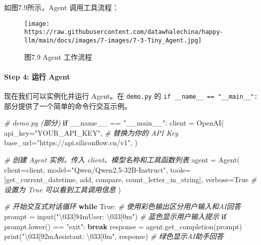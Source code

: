 \documentclass[
]{article}
\newenvironment{Shaded}{}{}
\newcommand{\BuiltInTok}[1]{\textcolor[rgb]{0.00,0.50,0.00}{#1}}
\newcommand{\CharTok}[1]{\textcolor[rgb]{0.25,0.44,0.63}{#1}}
\newcommand{\CommentTok}[1]{\textcolor[rgb]{0.38,0.63,0.69}{\textit{#1}}}
\newcommand{\ControlFlowTok}[1]{\textcolor[rgb]{0.00,0.44,0.13}{\textbf{#1}}}
\newcommand{\NormalTok}[1]{#1}
\newcommand{\OperatorTok}[1]{\textcolor[rgb]{0.40,0.40,0.40}{#1}}
\newcommand{\StringTok}[1]{\textcolor[rgb]{0.25,0.44,0.63}{#1}}
\newcommand{\VariableTok}[1]{\textcolor[rgb]{0.10,0.09,0.49}{#1}}
\begin{document}
如图7.9所示，Agent 调用工具流程：

\begin{figure}[htbp]\centering
\texttt{[image: https://raw.githubusercontent.com/datawhalechina/happy-llm/main/docs/images/7-images/7-3-Tiny\_Agent.jpg]}
\caption{图7.9 Agent 工作流程}
\end{figure}

\paragraph{Step 4: 运行 Agent}\label{step-4-ux8fd0ux884c-agent}

现在我们可以实例化并运行 Agent。在 \texttt{demo.py} 的
\texttt{if\ \_\_name\_\_\ ==\ "\_\_main\_\_":}
部分提供了一个简单的命令行交互示例。

\begin{Shaded}
\begin{Highlighting}[]
\CommentTok{\# demo.py (部分)}
\ControlFlowTok{if} \VariableTok{\_\_name\_\_} \OperatorTok{==} \StringTok{"\_\_main\_\_"}\NormalTok{:}
\NormalTok{    client }\OperatorTok{=}\NormalTok{ OpenAI(}
\NormalTok{        api\_key}\OperatorTok{=}\StringTok{"YOUR\_API\_KEY"}\NormalTok{, }\CommentTok{\# 替换为你的 API Key}
\NormalTok{        base\_url}\OperatorTok{=}\StringTok{"https://api.siliconflow.cn/v1"}\NormalTok{,}
\NormalTok{    )}

    \CommentTok{\# 创建 Agent 实例，传入 client、模型名称和工具函数列表}
\NormalTok{    agent }\OperatorTok{=}\NormalTok{ Agent(}
\NormalTok{        client}\OperatorTok{=}\NormalTok{client,}
\NormalTok{        model}\OperatorTok{=}\StringTok{"Qwen/Qwen2.5{-}32B{-}Instruct"}\NormalTok{,}
\NormalTok{        tools}\OperatorTok{=}\NormalTok{[get\_current\_datetime, add, compare, count\_letter\_in\_string],}
\NormalTok{        verbose}\OperatorTok{=}\VariableTok{True} \CommentTok{\# 设置为 True 可以看到工具调用信息}
\NormalTok{    )}

    \CommentTok{\# 开始交互式对话循环}
    \ControlFlowTok{while} \VariableTok{True}\NormalTok{:}
        \CommentTok{\# 使用彩色输出区分用户输入和AI回答}
\NormalTok{        prompt }\OperatorTok{=} \BuiltInTok{input}\NormalTok{(}\StringTok{"}\CharTok{\textbackslash{}033}\StringTok{[94mUser: }\CharTok{\textbackslash{}033}\StringTok{[0m"}\NormalTok{)  }\CommentTok{\# 蓝色显示用户输入提示}
        \ControlFlowTok{if}\NormalTok{ prompt.lower() }\OperatorTok{==} \StringTok{"exit"}\NormalTok{:}
            \ControlFlowTok{break}
\NormalTok{        response }\OperatorTok{=}\NormalTok{ agent.get\_completion(prompt)}
        \BuiltInTok{print}\NormalTok{(}\StringTok{"}\CharTok{\textbackslash{}033}\StringTok{[92mAssistant: }\CharTok{\textbackslash{}033}\StringTok{[0m"}\NormalTok{, response)  }\CommentTok{\# 绿色显示AI助手回答}
\end{Highlighting}
\end{Shaded}
\end{document}
